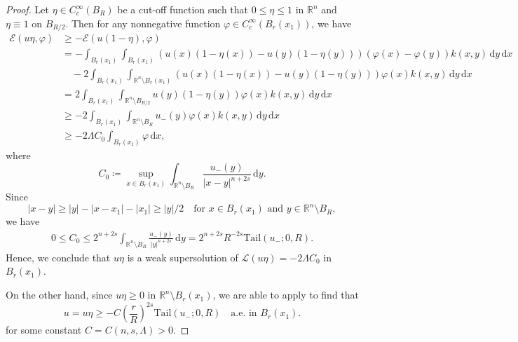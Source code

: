 \documentclass[11pt]{amsart}
\theoremstyle{plain}
\theoremstyle{definition}
\numberwithin{equation}{section}
\begin{document}
\begin{proof}
Let $\eta \in C^\infty_c(B_{R})$ be a cut-off function such that $0 \leq \eta \leq 1$ in $\mathbb{R}^n$ and $\eta \equiv 1$ on $B_{R/2}$. Then for any nonnegative function $\varphi \in C^\infty_c(B_r(x_1))$, we have
\begin{align*}
\mathcal{E}(u\eta, \varphi)
&\geq - \mathcal{E}(u(1-\eta), \varphi) \\
&= - \int_{B_r(x_1)} \int_{B_r(x_1)} (u(x)(1-\eta(x)) - u(y)(1-\eta(y)))(\varphi(x) -\varphi(y)) k(x, y)\,\mathrm{d}y \,\mathrm{d}x \\
&\quad - 2 \int_{B_r(x_1)} \int_{\mathbb{R}^n \setminus B_r(x_1)} (u(x)(1-\eta(x)) - u(y)(1-\eta(y))) \varphi(x) k(x, y) \,\mathrm{d}y \,\mathrm{d}x \\
&= 2 \int_{B_r(x_1)} \int_{\mathbb{R}^n \setminus B_{R/2}} u(y)(1-\eta(y))\varphi(x) k(x, y) \,\mathrm{d}y \,\mathrm{d}x \\
&\geq -2 \int_{B_r(x_1)} \int_{\mathbb{R}^n \setminus B_{R}} u_-(y) \varphi(x) k(x, y) \,\mathrm{d}y \,\mathrm{d}x \\
&\geq -2\Lambda C_0 \int_{B_r(x_1)} \varphi \,\mathrm{d}x,
\end{align*}
where
\begin{equation*}
C_0 \coloneqq \sup_{x \in B_r(x_1)} \int_{\mathbb{R}^n \setminus B_{R}} \frac{u_-(y)}{|x-y|^{n+2s}} \,\mathrm{d}y.
\end{equation*}
Since
\begin{equation*}
|x-y| \geq |y| - |x-x_1|-|x_1| \geq |y|/2 \quad \text{for $x \in B_r(x_1)$ and $y \in \mathbb{R}^n \setminus B_{R}$},
\end{equation*}
 we have
\begin{align*}
0 \leq C_0
\leq  2^{n+2s} \int_{\mathbb{R}^n \setminus B_{R}} \frac{u_-(y)}{|y|^{n+2s}} \,\mathrm{d}y=2^{n+2s} R^{-2s}\mathrm{Tail}(u_-; 0, R).
\end{align*}
Hence, we conclude that $u\eta$ is a weak supersolution of $\mathcal{L}(u\eta) = -2\Lambda C_0$ in $B_r(x_1)$.

On the other hand, since $u\eta \geq 0$ in $\mathbb{R}^n \setminus B_r(x_1)$, we are able to apply  to find that
\begin{equation*}
    u=u\eta \geq -C\left(\frac{r}{R}\right)^{2s}\mathrm{Tail}(u_-; 0, R) \quad \text{a.e.\ in $B_r(x_1)$}.
\end{equation*}
for some constant $C=C(n, s, \Lambda)>0$.
\end{proof}
\end{document}
